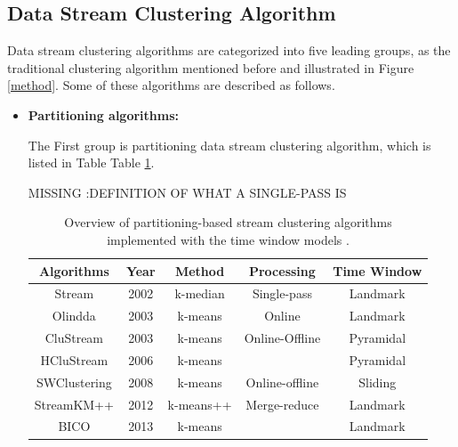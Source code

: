 \documentclass[../UNBThesis2.tex]{subfiles}
\begin{document}
\subsection{Data Stream Clustering Algorithm}
Data stream clustering algorithms are categorized into five leading groups, as the traditional clustering algorithm mentioned before and illustrated in Figure \ref{method}. Some of these algorithms are described as follows.




\begin{itemize}
    \item\textbf{Partitioning algorithms:}


The First group is partitioning data stream clustering algorithm, which is listed in Table Table \ref{landmarkwin}. 

MISSING :DEFINITION OF WHAT A SINGLE-PASS IS



\begin{table}[h]
    \centering
    \caption{Overview of partitioning-based stream clustering algorithms implemented with the time window models \protect\cite{carnein2019optimizing, mansalis2018evaluation}. }
    \label{landmarkwin}
    \small
    \begin{tabular}{c c c c c}
    \hline
      \textbf{Algorithms} & \textbf{Year} & \textbf{ Method } & \textbf{Processing} & \textbf{ Time Window}  \\
     \hline \midrule

      Stream \cite{o2002streaming}&   2002        &   k-median        &  Single-pass      & Landmark \\
     \hline
     Olindda \cite{spinosa2007olindda} &   2003        &   k-means         &   Online     & Landmark \\
    \hline
     CluStream \cite{aggarwal2003framework} &   2003 &  k-means  &  Online-Offline      & Pyramidal \\
    \hline   
     HCluStream \cite{yang2006hclustream} &    2006       &    k-means       &      & Pyramidal\\
    \hline    
     SWClustering \cite{zhou2008tracking} &    2008       &    k-means   &  Online-offline    & Sliding\\
       \hline
      StreamKM++ \cite{ackermann2012streamk} &    2012  &   k-means++   & Merge-reduce      & Landmark \\
    \hline 
      BICO \cite{fichtenberger2013bico} &    2013       &    k-means       &             & Landmark\\
    \hline
\bottomrule
    \end{tabular}
\end{table}




\end{itemize}
\end{document}
